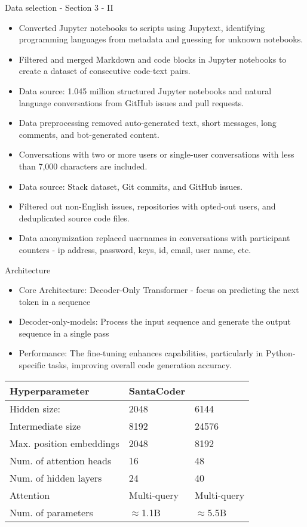 \begin{frame}{Data selection - Section 3 - II}
\begin{itemize}
\item Converted Jupyter notebooks to scripts using Jupytext, identifying programming languages from metadata and guessing for unknown notebooks.
\item Filtered and merged Markdown and code blocks in Jupyter notebooks to create a dataset of consecutive code-text pairs.
\item Data source: 1.045 million structured Jupyter notebooks and natural language conversations from GitHub issues and pull requests.
\item Data preprocessing removed auto-generated text, short messages, long comments, and bot-generated content.
\item Conversations with two or more users or single-user conversations with less than 7,000 characters are included.
\item Data source: Stack dataset, Git commits, and GitHub issues.
\item Filtered out non-English issues, repositories with opted-out users, and deduplicated source code files.
\item Data anonymization replaced usernames in conversations with participant counters - ip address, password, keys, id, email, user name, etc.
\end{itemize}
\end{frame}

\begin{frame}{Architecture}
\begin{itemize}
\item Core Architecture: Decoder-Only Transformer - focus on predicting the next token in a sequence
\item Decoder-only-models: Process the input sequence and generate the output sequence in a single pass
\item Performance: The fine-tuning enhances capabilities, particularly in Python-specific tasks, improving overall code generation accuracy.
\end{itemize}
\begin{tabular}{l|l|l}
\hline
Hyperparameter &SantaCoder&\\
\hline
Hidden size:&2048&6144\\
Intermediate size& 8192&24576\\
Max. position embeddings& 2048&8192\\
Num. of attention heads& 16&48\\
Num. of hidden layers &24 &40\\
Attention &Multi-query&Multi-query\\
Num. of parameters&$\approx$1.1B &$\approx$5.5B\\
\hline
\end{tabular}
\end{frame}

